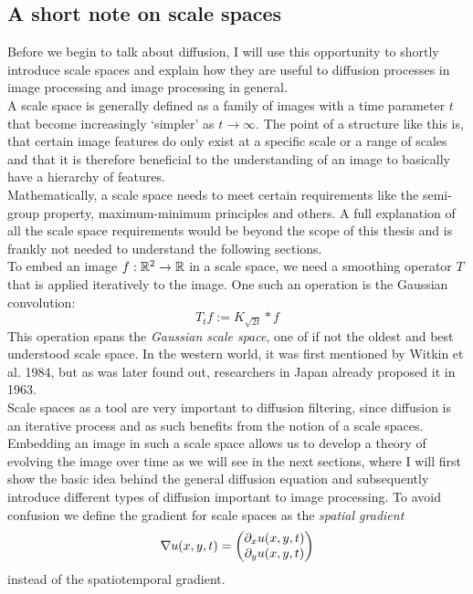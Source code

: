 \subsection{A short note on scale spaces}
Before we begin to talk about diffusion, I will use this opportunity to shortly introduce scale
spaces and explain how they are useful to diffusion processes in image processing and image
processing in general.\\
A scale space is generally defined as a family of images with a time parameter $t$ that become
increasingly `simpler' as $t \to \infty$. The point of a structure like this is, that certain image
features do only exist at a specific scale or a range of scales and that it is therefore beneficial
to the understanding of an image to basically have a hierarchy of features.\\
Mathematically, a scale
space needs to meet certain requirements like the semi-group property, maximum-minimum principles
and others.
A full explanation of all the scale space requirements would be beyond the scope of this thesis
and is frankly not needed to understand the following sections.\\
To embed an image $f:\mathbb{R}^2 \rightarrow \mathbb{R}$ in a scale space, we need a smoothing
operator $T$ that is applied iteratively to the image. One such an operation is the Gaussian
convolution: 
\begin{equation}
    T_tf := K_{\sqrt{2t}} * f
\end{equation}
This operation spans the \textit{Gaussian scale space}, one of if not the oldest and best
understood scale space. In the western world, it was first mentioned by Witkin et
al.\cite{witkin84} 1984, but as was later found out, researchers in Japan already proposed it in
1963\cite{weickert-ishikawa}.\\
Scale spaces as a tool are very important to diffusion filtering, since diffusion is an iterative
process and as such benefits from the notion of a scale spaces. Embedding an image in such a scale
space allows us to develop a theory of evolving the image over time as we will see in the next
sections, where I will first show the basic idea behind the general diffusion equation and
subsequently introduce different types of diffusion important to image processing.
To avoid confusion we define the gradient for scale spaces as the \textit{spatial gradient} 
\begin{equation}
    \mathbf{\nabla} u(x, y, t) = \begin{pmatrix}
        \partial_x u(x, y, t)\\
        \partial_y u(x, y, t)
    \end{pmatrix} 
\end{equation}
instead of the spatiotemporal gradient.

